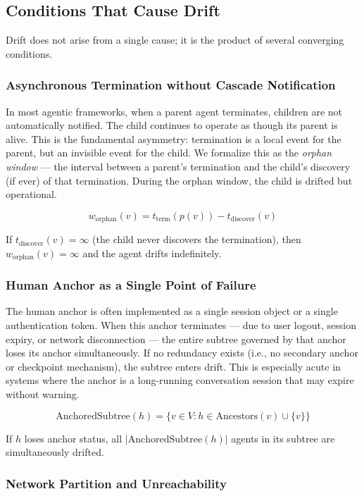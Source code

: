 \subsection{Conditions That Cause Drift}

Drift does not arise from a single cause; it is the product of several converging conditions.

\subsubsection{Asynchronous Termination without Cascade Notification}

In most agentic frameworks, when a parent agent terminates, children are not automatically notified. The child continues to operate as though its parent is alive. This is the fundamental asymmetry: termination is a local event for the parent, but an invisible event for the child. We formalize this as the \textit{orphan window} — the interval between a parent's termination and the child's discovery (if ever) of that termination. During the orphan window, the child is drifted but operational.

\[
w_{\text{orphan}}(v) = t_{\text{term}}(p(v)) - t_{\text{discover}}(v)
\]

If $t_{\text{discover}}(v) = \infty$ (the child never discovers the termination), then $w_{\text{orphan}}(v) = \infty$ and the agent drifts indefinitely.

\subsubsection{Human Anchor as a Single Point of Failure}

The human anchor is often implemented as a single session object or a single authentication token. When this anchor terminates — due to user logout, session expiry, or network disconnection — the entire subtree governed by that anchor loses its anchor simultaneously. If no redundancy exists (i.e., no secondary anchor or checkpoint mechanism), the subtree enters drift. This is especially acute in systems where the anchor is a long-running conversation session that may expire without warning.

\[
\text{AnchoredSubtree}(h) = \{ v \in V : h \in \text{Ancestors}(v) \cup \{v\} \}
\]

If $h$ loses anchor status, all $| \text{AnchoredSubtree}(h) |$ agents in its subtree are simultaneously drifted.

\subsubsection{Network Partition and Unreachability}

